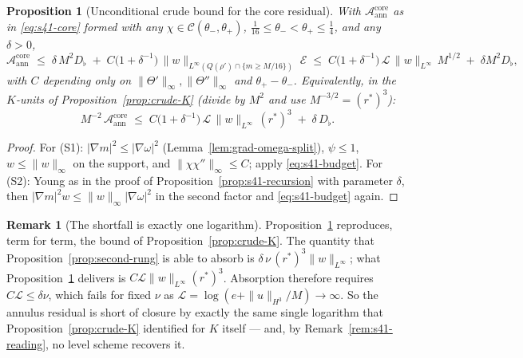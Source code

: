 \documentclass[11pt]{article}
\newtheorem{proposition}[theorem]{Proposition}
\theoremstyle{definition}
\newtheorem{remark}[theorem]{Remark}
\theoremstyle{remark}
\begin{document}
\begin{proposition}[Unconditional crude bound for the core residual]
  \label{prop:s41-crude}
  With $\mathcal{A}^{\mathrm{core}}_{\mathrm{ann}}$ as in
  \eqref{eq:s41-core} formed with any
  $\chi\in\mathcal{C}(\theta_-,\theta_+)$,
  $\tfrac1{16}\leq\theta_-<\theta_+\leq\tfrac14$, and any $\delta>0$,
  \[
    \mathcal{A}^{\mathrm{core}}_{\mathrm{ann}}
    \;\leq\; \delta\,M^2D_\flat
    \;+\; C\bigl(1+\delta^{-1}\bigr)\,
      \|w\|_{L^\infty(Q(\rho')\cap\{m\geq M/16\})}\;\mathcal{E}
    \;\leq\; C\bigl(1+\delta^{-1}\bigr)\,\mathcal{L}\,\|w\|_{L^\infty}\,M^{1/2}
      \;+\;\delta M^2D_\flat,
  \]
  with $C$ depending only on $\|\Theta'\|_\infty,\|\Theta''\|_\infty$ and
  $\theta_+-\theta_-$. Equivalently, in the $K$-units of
  Proposition~\ref{prop:crude-K} (divide by $M^2$ and use
  $M^{-3/2}=(r^*)^3$):
  \[
    M^{-2}\,\mathcal{A}^{\mathrm{core}}_{\mathrm{ann}}
    \;\leq\; C\bigl(1+\delta^{-1}\bigr)\,\mathcal{L}\,\|w\|_{L^\infty}\,(r^*)^3
    \;+\;\delta\,D_\flat .
  \]
\end{proposition}
\begin{proof}
  For (S1): $|\nabla m|^2\leq|\nabla\omega|^2$
  (Lemma~\ref{lem:grad-omega-split}), $\psi\leq1$, $w\leq\|w\|_\infty$ on the
  support, and $\|\chi\chi''\|_\infty\leq C$; apply \eqref{eq:s41-budget}.
  For (S2): Young as in the proof of
  Proposition~\ref{prop:s41-recursion} with parameter $\delta$, then
  $|\nabla m|^2w\leq\|w\|_\infty|\nabla\omega|^2$ in the second factor and
  \eqref{eq:s41-budget} again.
\end{proof}

\begin{remark}[The shortfall is exactly one logarithm]\label{rem:s41-shortfall}
  Proposition~\ref{prop:s41-crude} reproduces, term for term, the bound of
  Proposition~\ref{prop:crude-K}. The quantity that
  Proposition~\ref{prop:second-rung} is able to absorb is
  $\delta\,\nu\,(r^*)^3\|w\|_{L^\infty}$; what
  Proposition~\ref{prop:s41-crude} delivers is
  $C\mathcal{L}\|w\|_{L^\infty}(r^*)^3$. Absorption therefore requires
  $C\mathcal{L}\leq\delta\nu$, which fails for fixed $\nu$ as
  $\mathcal{L}=\log(e+\|u\|_{H^3}/M)\to\infty$. So the annulus residual is
  short of closure by exactly the same single logarithm that
  Proposition~\ref{prop:crude-K} identified for $K$ itself --- and, by
  Remark~\ref{rem:s41-reading}, no level scheme recovers it.
\end{remark}
\end{document}
